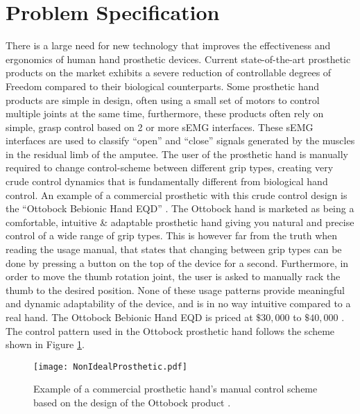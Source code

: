 \documentclass[../main.tex]{subfiles}
\begin{document}
\section{Problem Specification}

There is a large need for new technology that improves the effectiveness and ergonomics of human hand prosthetic devices.
Current state-of-the-art prosthetic products on the market exhibits a severe reduction of controllable degrees of Freedom compared to their biological counterparts.
Some prosthetic hand products are simple in design, often using a small set of motors to control multiple joints at the same time, furthermore, these products often rely on simple, grasp control based on 2 or more \gls{sEMG} interfaces.
These \gls{sEMG} interfaces are used to classify ``open'' and ``close'' signals generated by the muscles in the residual limb of the amputee.
The user of the prosthetic hand is manually required to change control-scheme between different grip types, creating very crude control dynamics that is fundamentally different from biological hand control.
An example of a commercial prosthetic with this crude control design is the ``Ottobock Bebionic Hand EQD'' \cite{ottobock}.
The Ottobock hand is marketed as being a comfortable, intuitive \& adaptable prosthetic hand giving you natural and precise control of a wide range of grip types.
This is however far from the truth when reading the usage manual, that states that changing between grip types can be done by pressing a button on the top of the device for a second.
Furthermore, in order to move the thumb rotation joint, the user is asked to manually rack the thumb to the desired position.
None of these usage patterns provide meaningful and dynamic adaptability of the device, and is in no way intuitive compared to a real hand.
The Ottobock Bebionic Hand EQD is priced at $\$30,000$ to $\$40,000$ \cite{ottobock-prices}.
The control pattern used in the Ottobock prosthetic hand follows the scheme shown in Figure \ref{fig:nonidealprosthetic}.

\begin{figure}[H]
\begin{center}
\texttt{[image: NonIdealProsthetic.pdf]}
\caption{Example of a commercial prosthetic hand's manual control scheme based on the design of the Ottobock product \cite{ottobock}.}
\label{fig:nonidealprosthetic}
\end{center}
\end{figure}

\end{document}
